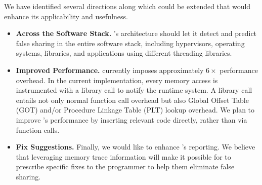 \label{sec:futurework}

We have identified several directions along which \Predator{} could be extended that would enhance its applicability and usefulness.

\begin{itemize}

\item \textbf{Across the Software Stack.} 
\Predator{}'s architecture should let it detect and predict false sharing in the entire software stack, including hypervisors, operating systems, libraries, and applications using different threading libraries.

\item \textbf{Improved Performance.}
\Predator{} currently imposes approximately $6\times$ performance overhead. In the current implementation, every memory access is instrumented with a library call to notify the runtime system. A library call entails not only normal function call overhead but also Global Offset Table (GOT) and/or Procedure Linkage Table (PLT) lookup overhead. We plan to improve \Predator{}'s performance by inserting relevant code directly, rather than via function calls.

\item \textbf{Fix Suggestions.} Finally, we would like to enhance \Predator{}'s reporting. We believe that leveraging memory trace information will make it possible for \Predator{} to prescribe specific fixes to the programmer to help them eliminate false sharing.
  
\end{itemize}
